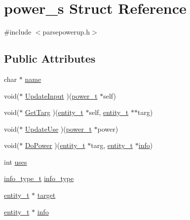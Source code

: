 \hypertarget{structpower__s}{}\section{power\+\_\+s Struct Reference}
\label{structpower__s}


{\ttfamily \#include $<$parsepowerup.\+h$>$}

\subsection*{Public Attributes}
\begin{DoxyCompactItemize}
\item 
char $\ast$ \hyperlink{structpower__s_a072da7e3651629b4b5bd3c1957449cd7}{name}
\item 
void($\ast$ \hyperlink{structpower__s_a6a640bccecca9b06b6f45eab33374a8c}{Update\+Input} )(\hyperlink{parsepowerup_8h_a5b6034e874b6462f78a13c5202a4d2eb}{power\+\_\+t} $\ast$self)
\item 
void($\ast$ \hyperlink{structpower__s_a28669829daf806ea3571ea2d625bd8a3}{Get\+Targ} )(\hyperlink{entity_8h_ad0c3149de5542539dcb5c9251c68fbd2}{entity\+\_\+t} $\ast$self, \hyperlink{entity_8h_ad0c3149de5542539dcb5c9251c68fbd2}{entity\+\_\+t} $\ast$$\ast$targ)
\item 
void($\ast$ \hyperlink{structpower__s_a26c1b68fef6f0a99d8188857bbb5ffb4}{Update\+Use} )(\hyperlink{parsepowerup_8h_a5b6034e874b6462f78a13c5202a4d2eb}{power\+\_\+t} $\ast$power)
\item 
void($\ast$ \hyperlink{structpower__s_a098d549981525670c9a0547af9252323}{Do\+Power} )(\hyperlink{entity_8h_ad0c3149de5542539dcb5c9251c68fbd2}{entity\+\_\+t} $\ast$targ, \hyperlink{entity_8h_ad0c3149de5542539dcb5c9251c68fbd2}{entity\+\_\+t} $\ast$\hyperlink{structpower__s_a32cc3097e3d59f2777c519bce21b12dc}{info})
\item 
int \hyperlink{structpower__s_a310abaa0adf5658783bcab8845a9a026}{uses}
\item 
\hyperlink{parsepowerup_8h_a3482867a9df48b02d0dcfe459b6e81c5}{info\+\_\+type\+\_\+t} \hyperlink{structpower__s_a519c09477c21260a2be83a6ceb09cc33}{info\+\_\+type}
\item 
\hyperlink{entity_8h_ad0c3149de5542539dcb5c9251c68fbd2}{entity\+\_\+t} $\ast$ \hyperlink{structpower__s_aec96005783c9c49c9998f580223370e5}{target}
\item 
\hyperlink{entity_8h_ad0c3149de5542539dcb5c9251c68fbd2}{entity\+\_\+t} $\ast$ \hyperlink{structpower__s_a32cc3097e3d59f2777c519bce21b12dc}{info}
\end{DoxyCompactItemize}


